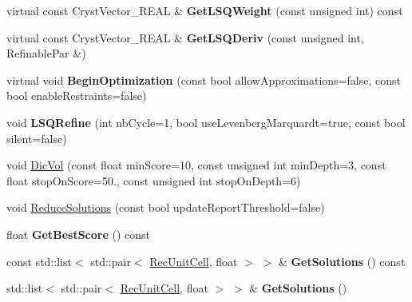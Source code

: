 \begin{DoxyCompactItemize}
\mbox{\label{class_obj_cryst_1_1_cell_explorer_abbcb86b67e2ddb49be2729a01fc3801c}} 
virtual const Cryst\+Vector\+\_\+\+R\+E\+AL \& {\bfseries Get\+L\+S\+Q\+Weight} (const unsigned int) const
\item 
\mbox{\label{class_obj_cryst_1_1_cell_explorer_aeae6adadf0eebf4c062397274433bcb2}} 
virtual const Cryst\+Vector\+\_\+\+R\+E\+AL \& {\bfseries Get\+L\+S\+Q\+Deriv} (const unsigned int, Refinable\+Par \&)
\item 
\mbox{\label{class_obj_cryst_1_1_cell_explorer_a21ef1a644e6b0a54a902f5ab70056725}} 
virtual void {\bfseries Begin\+Optimization} (const bool allow\+Approximations=false, const bool enable\+Restraints=false)
\item 
\mbox{\label{class_obj_cryst_1_1_cell_explorer_a08259c076c61fef7e81fb69f7fc046dc}} 
void {\bfseries L\+S\+Q\+Refine} (int nb\+Cycle=1, bool use\+Levenberg\+Marquardt=true, const bool silent=false)
\item 
void \mbox{\hyperlink{class_obj_cryst_1_1_cell_explorer_adba0983c3b1dc6846ccf0d9ee7dbfa98}{Dic\+Vol}} (const float min\+Score=10, const unsigned int min\+Depth=3, const float stop\+On\+Score=50., const unsigned int stop\+On\+Depth=6)
\item 
void \mbox{\hyperlink{class_obj_cryst_1_1_cell_explorer_ae32d743e1e6df33e09243cd7bb9a8c52}{Reduce\+Solutions}} (const bool update\+Report\+Threshold=false)
\item 
\mbox{\label{class_obj_cryst_1_1_cell_explorer_a0ffc0ffdb7074b1c85cfac9aa22ce5bd}} 
float {\bfseries Get\+Best\+Score} () const
\item 
\mbox{\label{class_obj_cryst_1_1_cell_explorer_acadf5ea26f0b13bcac554e3ee7e8adda}} 
const std\+::list$<$ std\+::pair$<$ \mbox{\hyperlink{class_obj_cryst_1_1_rec_unit_cell}{Rec\+Unit\+Cell}}, float $>$ $>$ \& {\bfseries Get\+Solutions} () const
\item 
\mbox{\label{class_obj_cryst_1_1_cell_explorer_a777a911fce32fc12e1ff3e19c2250ac6}} 
std\+::list$<$ std\+::pair$<$ \mbox{\hyperlink{class_obj_cryst_1_1_rec_unit_cell}{Rec\+Unit\+Cell}}, float $>$ $>$ \& {\bfseries Get\+Solutions} ()
\end{DoxyCompactItemize}



